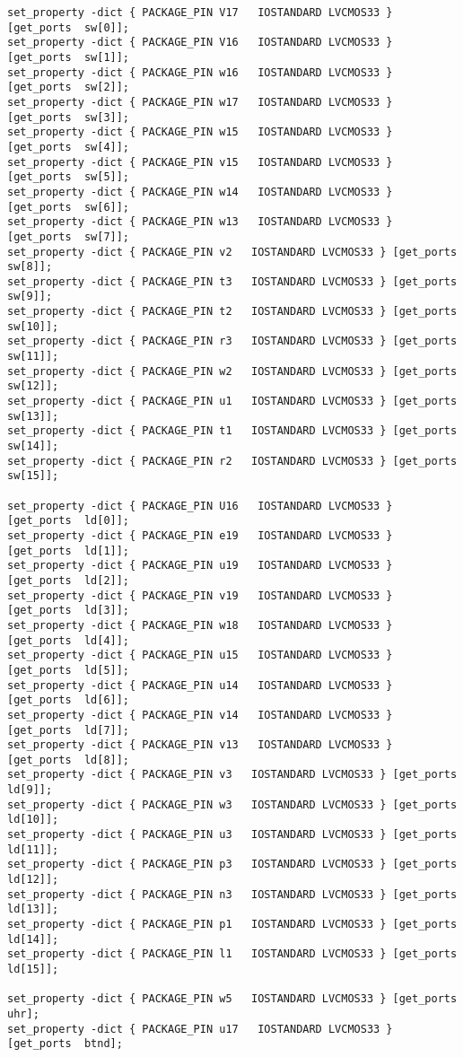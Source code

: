 \documentclass{article}
\begin{document}
\begin{verbatim}
set_property -dict { PACKAGE_PIN V17   IOSTANDARD LVCMOS33 } [get_ports  sw[0]];
set_property -dict { PACKAGE_PIN V16   IOSTANDARD LVCMOS33 } [get_ports  sw[1]];
set_property -dict { PACKAGE_PIN w16   IOSTANDARD LVCMOS33 } [get_ports  sw[2]];
set_property -dict { PACKAGE_PIN w17   IOSTANDARD LVCMOS33 } [get_ports  sw[3]];
set_property -dict { PACKAGE_PIN w15   IOSTANDARD LVCMOS33 } [get_ports  sw[4]];
set_property -dict { PACKAGE_PIN v15   IOSTANDARD LVCMOS33 } [get_ports  sw[5]];
set_property -dict { PACKAGE_PIN w14   IOSTANDARD LVCMOS33 } [get_ports  sw[6]];
set_property -dict { PACKAGE_PIN w13   IOSTANDARD LVCMOS33 } [get_ports  sw[7]];
set_property -dict { PACKAGE_PIN v2   IOSTANDARD LVCMOS33 } [get_ports  sw[8]];
set_property -dict { PACKAGE_PIN t3   IOSTANDARD LVCMOS33 } [get_ports  sw[9]];
set_property -dict { PACKAGE_PIN t2   IOSTANDARD LVCMOS33 } [get_ports  sw[10]];
set_property -dict { PACKAGE_PIN r3   IOSTANDARD LVCMOS33 } [get_ports  sw[11]];
set_property -dict { PACKAGE_PIN w2   IOSTANDARD LVCMOS33 } [get_ports  sw[12]];
set_property -dict { PACKAGE_PIN u1   IOSTANDARD LVCMOS33 } [get_ports  sw[13]];
set_property -dict { PACKAGE_PIN t1   IOSTANDARD LVCMOS33 } [get_ports  sw[14]];
set_property -dict { PACKAGE_PIN r2   IOSTANDARD LVCMOS33 } [get_ports  sw[15]];

set_property -dict { PACKAGE_PIN U16   IOSTANDARD LVCMOS33 } [get_ports  ld[0]];
set_property -dict { PACKAGE_PIN e19   IOSTANDARD LVCMOS33 } [get_ports  ld[1]];
set_property -dict { PACKAGE_PIN u19   IOSTANDARD LVCMOS33 } [get_ports  ld[2]];
set_property -dict { PACKAGE_PIN v19   IOSTANDARD LVCMOS33 } [get_ports  ld[3]];
set_property -dict { PACKAGE_PIN w18   IOSTANDARD LVCMOS33 } [get_ports  ld[4]];
set_property -dict { PACKAGE_PIN u15   IOSTANDARD LVCMOS33 } [get_ports  ld[5]];
set_property -dict { PACKAGE_PIN u14   IOSTANDARD LVCMOS33 } [get_ports  ld[6]];
set_property -dict { PACKAGE_PIN v14   IOSTANDARD LVCMOS33 } [get_ports  ld[7]];
set_property -dict { PACKAGE_PIN v13   IOSTANDARD LVCMOS33 } [get_ports  ld[8]];
set_property -dict { PACKAGE_PIN v3   IOSTANDARD LVCMOS33 } [get_ports  ld[9]];
set_property -dict { PACKAGE_PIN w3   IOSTANDARD LVCMOS33 } [get_ports  ld[10]];
set_property -dict { PACKAGE_PIN u3   IOSTANDARD LVCMOS33 } [get_ports  ld[11]];
set_property -dict { PACKAGE_PIN p3   IOSTANDARD LVCMOS33 } [get_ports  ld[12]];
set_property -dict { PACKAGE_PIN n3   IOSTANDARD LVCMOS33 } [get_ports  ld[13]];
set_property -dict { PACKAGE_PIN p1   IOSTANDARD LVCMOS33 } [get_ports  ld[14]];
set_property -dict { PACKAGE_PIN l1   IOSTANDARD LVCMOS33 } [get_ports  ld[15]];

set_property -dict { PACKAGE_PIN w5   IOSTANDARD LVCMOS33 } [get_ports  uhr];
set_property -dict { PACKAGE_PIN u17   IOSTANDARD LVCMOS33 } [get_ports  btnd];
\end{verbatim}
\end{document}

